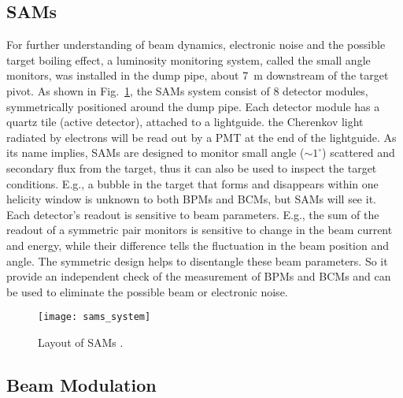 \subsection{SAMs}
For further understanding of beam dynamics, electronic noise and the possible target 
boiling effect, a luminosity monitoring system, called the small angle monitors, 
was installed in the dump pipe, about 7~m downstream of the target pivot. As shown
in Fig.~\ref{fig:sams}, the SAMs system consist of 8 detector modules, symmetrically 
positioned around the dump pipe. Each detector module has a quartz tile (active 
detector), attached to a lightguide. the Cherenkov light radiated by electrons
will be read out by a PMT at the end of the lightguide. 
As its name implies, SAMs are designed to monitor small angle ($\sim 1^\circ$)
scattered and secondary flux from the target, thus it can also be used to
inspect the target conditions. E.g., a bubble in the target that forms and disappears
within one helicity window is unknown to both BPMs and BCMs, but SAMs will see it.
Each detector's readout is sensitive to beam parameters.
E.g., the sum of the readout of a symmetric pair monitors is sensitive to change 
in the beam current and energy, while their difference tells the fluctuation in 
the beam position and angle.
The symmetric design helps to disentangle these beam parameters. So it provide
an independent check of the measurement of BPMs and BCMs and can be used to eliminate
the possible beam or electronic noise.
\begin{figure}[!h]
    \centering
    \texttt{[image: sams\_system]}
    \caption{Layout of SAMs \cite{Devi2021}.}
    \label{fig:sams}
\end{figure}

\subsection{Beam Modulation}
\begin{comment}
It is very important for PVES to control the systematic uncertainty, especially
the one from beam fluctuation (HCBA). Ideally, the electrons bunches with opposite
polarization should have exactly the same intensity and energy, hitting the target 
at the same place with the same angle, which is obviously impossible in reality. 
So we need to correct the false asymmetry introduce by the beam fluctuation. There are a
few methods to do the correction, one of them is the so called Beam modulation.
The idea is to introduce man-made fluctuations to the beam through the 
modulation system, then we can measure the changes in monitors and detectors 
to find the sensitivities of detectors to changes in energy, position and angle,
which will be used to correct the measured asymmetry.
\end{comment}

